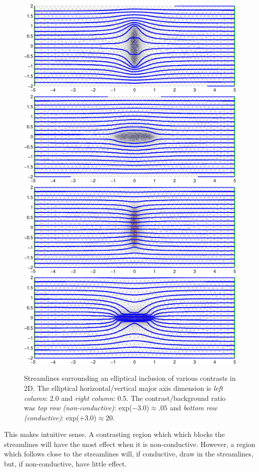 \documentclass[10pt,a4paper]{article}
\begin{document}
\begin{multicols}{2}
\begin{figure}[H]
\centering
\includegraphics[width=.50\columnwidth,trim= 0 10 0 0,clip]{contrasts_04b.pdf}%
\hspace{0.5mm}
\includegraphics[width=.478\columnwidth,trim=19.5 10 0 0,clip]{contrasts_04p.pdf}%
\vspace{0.5mm}
\\
\includegraphics[width=.50\columnwidth,trim= 0  0 0 0,clip]{contrasts_04h.pdf}%
\hspace{0.5mm}
\includegraphics[width=.478\columnwidth,trim=19.5  0 0 0,clip]{contrasts_04v.pdf}%
\caption{\label{fig:streamlines}%
Streamlines surrounding an elliptical inclusion of various contrasts in 2D. 
The elliptical horizontal/vertical major axis dimension is 
{\em left column}: 2.0
and 
{\em right column}: 0.5.
The contrast/background ratio was 
{\em top row (non-conductive)}: exp($-3.0$)$\approx.05$ 
and 
{\em bottom row (conductive)}: exp($+3.0$)$\approx20$.
}
\end{figure}

  This makes intuitive sense. A contrasting region which which blocks
the streamlines will have the most effect when it is non-conductive.
However, a region which follows close to the streamlines will,
if conductive, draw in the streamlines, but, if non-conductive, have
little effect.


\end{multicols}
\end{document}
